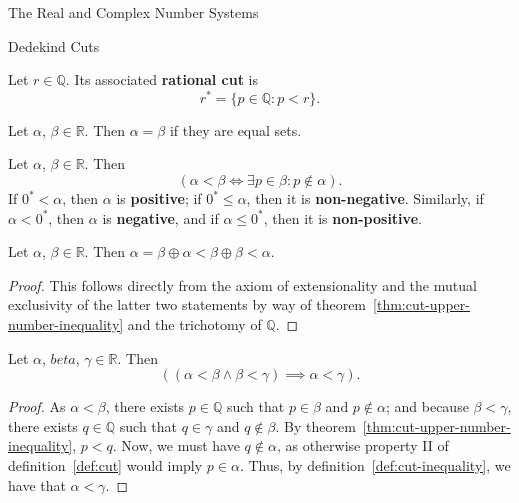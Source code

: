 \begin{chapter}{The Real and Complex Number Systems}
\begin{section}{Dedekind Cuts}
	\begin{definition}
	\label{def:rational cut}
		Let $r \in \mathbb{Q}$. Its associated \textbf{rational cut} is
		\[ r^* = \{p \in \mathbb{Q} : p < r\}. \] 
	\end{definition}

	\begin{definition}
	\label{def:cut-equality}
		Let $\alpha$, $\beta \in \mathbb{R}$. Then $\alpha = \beta$ if they are
		equal sets.
	\end{definition}

	\begin{definition}
	\label{def:cut-inequality}
		Let $\alpha$, $\beta \in \mathbb{R}$. Then
		\[ (\alpha < \beta \iff \exists p \in \beta : p \nin \alpha). \] 
		If $0^* < \alpha$, then $\alpha$ is \textbf{positive}; if $0^* \leq
		\alpha$, then it is \textbf{non-negative}. Similarly, if $\alpha <
		0^*$, then $\alpha$ is \textbf{negative}, and if $\alpha \leq 0^*$,
		then it is \textbf{non-positive}.
	\end{definition}

	\begin{theorem}
	\label{thm:trichotomy}
		Let $\alpha$, $\beta \in \mathbb{R}$. Then $\alpha = \beta \oplus \alpha
		< \beta \oplus \beta < \alpha$.
	\end{theorem}

	\begin{proof}
		This follows directly from the axiom of extensionality and the mutual
		exclusivity of the latter two statements by way of
		theorem~\ref{thm:cut-upper-number-inequality} and
		the trichotomy of $\mathbb{Q}$.
	\end{proof}

	\begin{theorem}
	\label{thm:inequality-transitivity}
		Let $\alpha$, $beta$, $\gamma \in \mathbb{R}$. Then
		\[ ((\alpha < \beta \land \beta < \gamma) \implies \alpha < \gamma). \] 	
	\end{theorem}

	\begin{proof}
		As $\alpha < \beta$, there exists $p \in \mathbb{Q}$ such that $p \in
		\beta$ and $p \nin \alpha$; and because $\beta < \gamma$, there
		exists $q \in \mathbb{Q}$ such that $q \in \gamma$ and $q \nin
		\beta$. By theorem~\ref{thm:cut-upper-number-inequality}, $p < q$. Now,
		we must have $q \nin \alpha$, as otherwise property II of
		definition~\ref{def:cut} would imply $p \in \alpha$. Thus, by
		definition~\ref{def:cut-inequality}, we have that $\alpha < \gamma$.
	\end{proof}


\end{section}
\end{chapter}
